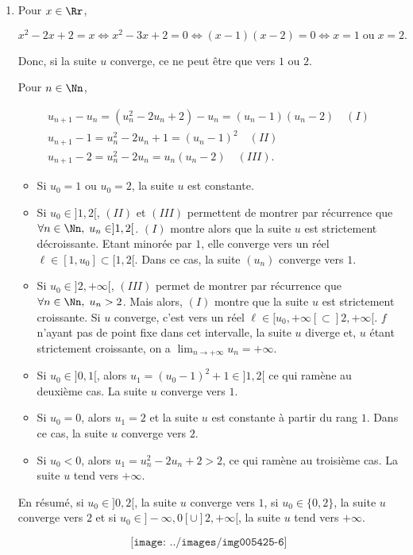 {{\begin{enumerate}
$$\texttt{[image: ../images/img005425-5]}$$


\item  Pour $x\in\Rr$,

$$x^2-2x+2=x\Leftrightarrow x^2-3x+2=0\Leftrightarrow(x-1)(x-2)=0\Leftrightarrow x=1\;\mbox{ou}\;x=2.$$

Donc, si la suite $u$ converge, ce ne peut être que vers $1$ ou $2$.

Pour $n\in\Nn$,

$$\begin{array}{l}
u_{n+1}-u_n=(u_n^2-2u_n+2)-u_n=(u_n-1)(u_n-2)\quad(I)\\
u_{n+1}-1=u_n^2-2u_n+1=(u_n-1)^2\quad(II)\\
u_{n+1}-2=u_n^2-2u_n=u_n(u_n-2)\quad(III).
\end{array}
$$

\begin{itemize}
\item[\textbf{1er cas.}] Si $u_0=1$ ou $u_0=2$, la suite $u$ est constante.
\item[\textbf{2ème cas.}] Si $u_0\in]1,2[$, $(II)$ et $(III)$ permettent de montrer par récurrence que $\forall n\in\Nn,\;u_n\in]1,2[$. $(I)$ montre alors que la suite $u$ est strictement décroissante. Etant minorée par $1$, elle converge vers un réel $\ell\in[1,u_0]\subset[1,2[$. Dans ce cas, la suite $(u_n)$ converge vers $1$.
\item[\textbf{3ème cas.}] Si $u_0\in]2,+\infty[$, $(III)$ permet de montrer par récurrence que $\forall n\in\Nn,\;u_n>2$. Mais alors, $(I)$ montre que la suite $u$ est strictement croissante. Si $u$ converge, c'est vers un réel $\ell\in[u_0,+\infty[\subset]2,+\infty[$. $f$ n'ayant pas de point fixe dans cet intervalle, la suite $u$ diverge et, $u$ étant strictement croissante, on a $\lim_{n\rightarrow +\infty}u_n=+\infty$.
\item[\textbf{4ème cas.}] Si $u_0\in]0,1[$, alors $u_1=(u_0-1)^2+1\in]1,2[$ ce qui ramène au deuxième cas. La suite $u$ converge vers $1$.
\item[\textbf{5ème cas.}] Si $u_0=0$, alors $u_1=2$ et la suite $u$ est constante à partir du rang $1$. Dans ce cas, la suite $u$ converge vers $2$.
\item[\textbf{6ème cas.}] Si $u_0<0$, alors $u_1=u_n^2-2u_n+2>2$, ce qui ramène au troisième cas. La suite $u$ tend vers $+\infty$.
\end{itemize}

En résumé, si $u_0\in]0,2[$, la suite $u$ converge vers $1$, si $u_0\in\{0,2\}$, la suite $u$ converge vers $2$ et si $u_0\in]-\infty,0[\cup]2,+\infty[$, la suite $u$ tend vers $+\infty$.

$$\texttt{[image: ../images/img005425-6]}$$

\end{enumerate}}
}